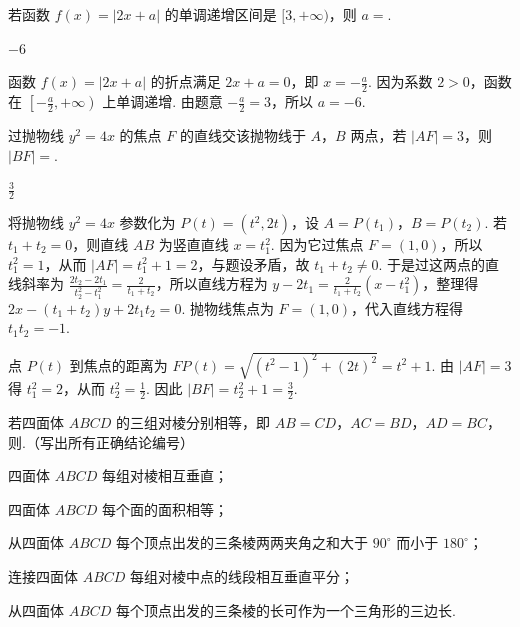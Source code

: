 \begin{problem}
若函数 \( f(x) = |2x + a| \) 的单调递增区间是 \([3, +\infty)\)，则 \( a = \)\fillinblank{}.
\end{problem}

\begin{answer}
\(-6\)
\end{answer}

\begin{solution}
函数 \(f(x)=|2x+a|\) 的折点满足 \(2x+a=0\)，即 \(x=-\frac{a}{2}\). 因为系数 \(2>0\)，函数在 \(\left[-\frac{a}{2},+\infty\right)\) 上单调递增. 由题意 \(-\frac{a}{2}=3\)，所以 \(a=-6\).
\end{solution}

\begin{problem}
过抛物线 \( y^{2}=4x \) 的焦点 \(F\) 的直线交该抛物线于 \(A\)，\(B\) 两点，若 \( |AF|=3 \)，则 \( |BF|= \)\fillinblank{}.
\end{problem}

\begin{answer}
\(\frac{3}{2}\)
\end{answer}

\begin{solution}
将抛物线 \(y^2=4x\) 参数化为 \(P(t)=(t^2,2t)\)，设 \(A=P(t_1)\)，\(B=P(t_2)\). 若 \(t_1+t_2=0\)，则直线 \(AB\) 为竖直直线 \(x=t_1^2\). 因为它过焦点 \(F=(1,0)\)，所以 \(t_1^2=1\)，从而 \(|AF|=t_1^2+1=2\)，与题设矛盾，故 \(t_1+t_2\ne0\). 于是过这两点的直线斜率为
\(\frac{2t_2-2t_1}{t_2^2-t_1^2}=\frac{2}{t_1+t_2}\)，所以直线方程为
\(y-2t_1=\frac{2}{t_1+t_2}(x-t_1^2)\)，整理得
\(2x-(t_1+t_2)y+2t_1t_2=0\). 抛物线焦点为 \(F=(1,0)\)，代入直线方程得 \(t_1t_2=-1\).

点 \(P(t)\) 到焦点的距离为 \(FP(t)=\sqrt{(t^2-1)^2+(2t)^2}=t^2+1\). 由 \(|AF|=3\) 得 \(t_1^2=2\)，从而 \(t_2^2=\frac{1}{2}\). 因此 \(|BF|=t_2^2+1=\frac{3}{2}\).
\end{solution}

\begin{problem}
若四面体 \(ABCD\) 的三组对棱分别相等，即 \(AB = CD\)，\(AC = BD\)，\(AD = BC\)，则\fillinblank{}.（写出所有正确结论编号）

\begin{circlelist}
\item 四面体 \(ABCD\) 每组对棱相互垂直；
\item 四面体 \(ABCD\) 每个面的面积相等；
\item 从四面体 \(ABCD\) 每个顶点出发的三条棱两两夹角之和大于 \(90^{\circ}\) 而小于 \(180^{\circ}\)；
\item 连接四面体 \(ABCD\) 每组对棱中点的线段相互垂直平分；
\item 从四面体 \(ABCD\) 每个顶点出发的三条棱的长可作为一个三角形的三边长.
\end{circlelist}
\end{problem}

